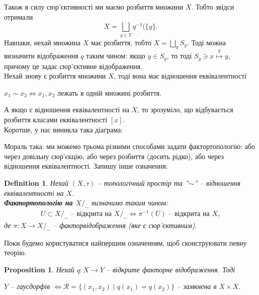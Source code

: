 \documentclass[a4paper, 10pt]{article}
\theoremstyle{theoremdd}
\newtheorem{definition}[theorem]{Definition}
\newtheorem{proposition}[theorem]{Proposition}
\begin{document}
\noindent Також в силу сюр'єктивності ми маємо розбиття множини $X$. Тобто звідси отримали 
\[
X = \bigsqcup_{y \in Y} q^{-1}(\{y\}.
\]
\noindent Навпаки, нехай множина $X$ має розбиття, тобто $X = \displaystyle\bigsqcup_{y} S_y$. Тоді можна визначити відображення $q$ таким чином: якщо $y \in S_y$, то тоді $S_y \ni x \overset{q}{\mapsto} y$, причому це задає сюр'єктивне відображення.
\bigskip \\
Нехай знову є розбиття множини $X$, тоді вона має відношення еквівалентності
\begin{center}
$x_1 \sim x_2 \iff x_1,x_2$ лежать в одній множині розбиття.
\end{center}
А якщо є відношення еквівалентності на $X$, то зрозуміло, що відбувається розбиття класами еквівалентності $[x]$.
\bigskip \\
Коротше, у нас виникла така діаграма:
\begin{figure}[H]
\centering
{}
\end{figure}
\noindent
Мораль така: ми можемо трьома різними способами задати фактортопологію: або через довільну сюр'єкцію, або через розбиття (досить рідко), або через відношення еквівалентності. Запишу інше означення:

\begin{definition}
Нехай $(X,\tau)$ -- топологічний простір та ''$\sim$'' -- відношення еквівалентності на $X$.\\
\textbf{Фактортопологію на $X/_\sim$} визначимо таким чином:
\begin{align*}
U \subset X/_\sim \text{ -- відкрита на } X/_\sim \iff \pi^{-1}(U) \text{ -- відкрита на }X,
\end{align*}
де $\pi \colon X \to X/_\sim$ -- факторвідображення (яке є сюр'єктивним).
\end{definition}
\noindent
Поки будемо користуватися найпершим означенням, щоб сконструювати певну теорію.

\begin{proposition}
Нехай $q \colon X \to Y$ -- відкрите факторне відображення. Тоді
\begin{center}
$Y$ -- гаусдорфів $\iff \mathcal{R} = \{ (x_1,x_2) \mid q(x_1) = q(x_2) \}$ -- замкнена в $X \times X$.
\end{center}
\end{proposition}
\end{document}
